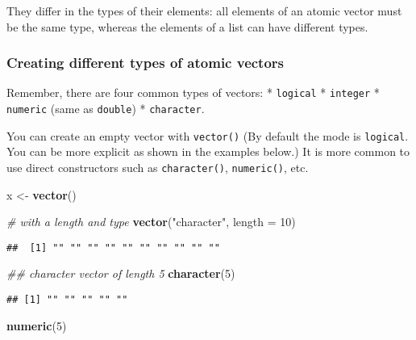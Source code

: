 \documentclass[
]{book}
\newenvironment{Shaded}{\begin{snugshade}}{\end{snugshade}}
\newcommand{\CommentTok}[1]{\textcolor[rgb]{0.56,0.35,0.01}{\textit{#1}}}
\newcommand{\DataTypeTok}[1]{\textcolor[rgb]{0.13,0.29,0.53}{#1}}
\newcommand{\DecValTok}[1]{\textcolor[rgb]{0.00,0.00,0.81}{#1}}
\newcommand{\KeywordTok}[1]{\textcolor[rgb]{0.13,0.29,0.53}{\textbf{#1}}}
\newcommand{\NormalTok}[1]{#1}
\newcommand{\StringTok}[1]{\textcolor[rgb]{0.31,0.60,0.02}{#1}}
\begin{document}
They differ in the types of their elements: all elements of an atomic vector must be the same type, whereas the elements of a list can have different types.

\hypertarget{creating-different-types-of-atomic-vectors}{%
\subsubsection{Creating different types of atomic vectors}\label{creating-different-types-of-atomic-vectors}}

Remember, there are four common types of vectors:
* \texttt{logical}
* \texttt{integer}
* \texttt{numeric} (same as \texttt{double})
* \texttt{character}.

You can create an empty vector with \texttt{vector()} (By default the mode is \texttt{logical}. You can be more explicit as shown in the examples below.) It is more common to use direct constructors such as \texttt{character()}, \texttt{numeric()}, etc.

\begin{Shaded}
\begin{Highlighting}[]
\NormalTok{x \textless{}{-}}\StringTok{ }\KeywordTok{vector}\NormalTok{()}

\CommentTok{\# with a length and type}
\KeywordTok{vector}\NormalTok{(}\StringTok{"character"}\NormalTok{, }\DataTypeTok{length =} \DecValTok{10}\NormalTok{)}
\end{Highlighting}
\end{Shaded}

\begin{verbatim}
##  [1] "" "" "" "" "" "" "" "" "" ""
\end{verbatim}

\begin{Shaded}
\begin{Highlighting}[]
\CommentTok{\#\# character vector of length 5}
\KeywordTok{character}\NormalTok{(}\DecValTok{5}\NormalTok{)}
\end{Highlighting}
\end{Shaded}

\begin{verbatim}
## [1] "" "" "" "" ""
\end{verbatim}

\begin{Shaded}
\begin{Highlighting}[]
\KeywordTok{numeric}\NormalTok{(}\DecValTok{5}\NormalTok{)}
\end{Highlighting}
\end{Shaded}
\end{document}
